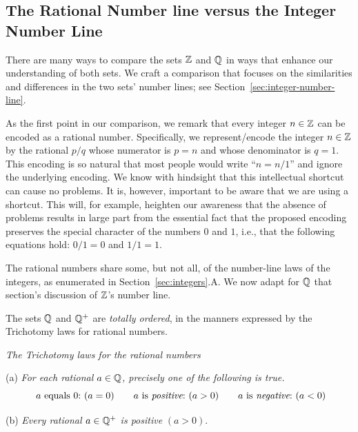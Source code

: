 \subsection{The Rational Number line versus the Integer Number Line}
\label{sec:Compare-Q-Z}

There are many ways to compare the sets $\mathbb{Z}$ and $\mathbb{Q}$ in ways that
enhance our understanding of both sets.  We craft a comparison that
focuses on the similarities and differences in the two sets' number
lines; see Section~\ref{sec:integer-number-line}.

As the first point in our comparison, we remark that every integer $n
\in \mathbb{Z}$ can be encoded as a rational 
number.  Specifically, we represent/encode the integer $n \in \mathbb{Z}$ by
the rational $p/q$ whose numerator is $p = n$ and whose denominator is
$q = 1$.  This encoding is so natural that most people would write
``$n = n/1$'' and ignore the underlying encoding.  We know with
hindsight that this intellectual shortcut can cause no problems.  It
is, however, important to be aware that we are using a shortcut.  This
will, for example, heighten our awareness that the absence of problems
results in large part from the essential fact that the proposed
encoding preserves the special character of the numbers $0$ and $1$,
i.e., that the following equations hold: $0/1 = 0$ and $1/1 = 1$.


The rational numbers share some, but not all, of the number-line laws
of the integers, as enumerated in Section~\ref{sec:integers}.A.
We now adapt for $\mathbb{Q}$ that section's discussion of $\mathbb{Z}$'s number line.

\medskip

\noindent
The sets $\mathbb{Q}$ and $\mathbb{Q}^+$ are {\em totally ordered}, in the manners
expressed by the Trichotomy laws for rational numbers.


\medskip

\noindent
{\it The Trichotomy laws for the rational numbers}

\noindent (a)
%
{\it For each rational $a \in \mathbb{Q}$, precisely one of the following is true.}
\[
\mbox{ $a$ equals $0$:} \ (a=0) \ \ \ \
\ \mbox{ $a$ is {\em positive}:} \ (a>0) \ \ \ \
 \ \mbox{ $a$ is {\em negative}:} \ (a<0)
\]

\noindent (b)
{\it Every rational $a \in \mathbb{Q}^+$ is positive} $(a>0)$.

